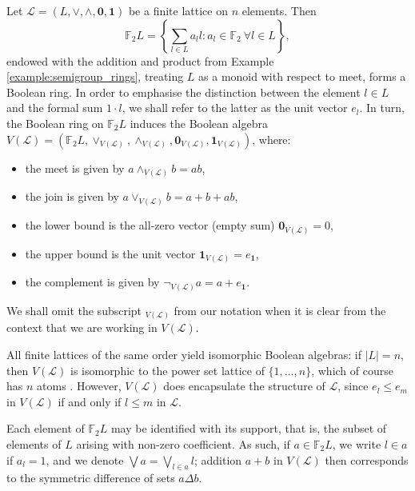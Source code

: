 \documentclass[a4paper, 11pt]{article}
\theoremstyle{plain}
\theoremstyle{definition}
\newcommand{\F} {\mathbb{F}}
\newcommand{\join}      {\lor}
\newcommand{\meet}      {\land}
\newcommand{\bigjoin}   {\bigvee}
\newcommand{\zero}      {\mathbf{0}}
\newcommand{\one}       {\mathbf{1}}
\begin{document}
Let $\mathcal{L} = (L, \join, \meet, \zero, \one)$ be a finite lattice on $n$ elements. Then 
\[
    \F_2 L = \left\{ \sum_{ l \in L } a_l l : a_l \in \F_2 \ \forall l \in L \right\},
\]
endowed with the addition and product from Example \ref{example:semigroup_rings}, treating $L$ as a monoid with respect to meet, forms a Boolean ring. In order to emphasise the distinction between the element $l \in L$ and the formal sum $1 \cdot l$, we shall refer to the latter as the unit vector $e_l$. In turn, the Boolean ring on $\F_2 L$ induces the Boolean algebra $V( \mathcal{L} ) = ( \F_2 L , \join_{ V( \mathcal{L} ) }, \meet_{ V( \mathcal{L} ) }, \zero_{ V( \mathcal{L} ) }, \one_{ V( \mathcal{L} ) } )$, where:
\begin{itemize}
    \item the meet is given by $a \meet_{ V( \mathcal{L} ) } b = ab$,

    \item the join is given by $a \join_{ V( \mathcal{L} ) } b = a + b + ab$,

    \item the lower bound is the all-zero vector (empty sum) $\zero_{ V( \mathcal{L} ) } = 0$,

    \item the upper bound is the unit vector $\one_{ V( \mathcal{L} ) } = e_\one$,

    \item the complement is given by $\neg_{ V( \mathcal{L} ) } a = a + e_\one$.
\end{itemize}
We shall omit the subscript $_{ V( \mathcal{L} ) }$ from our notation when it is clear from the context that we are working in $V( \mathcal{L} )$.

All finite lattices of the same order yield isomorphic Boolean algebras: if $|L| = n$, then $V( \mathcal{L} )$ is isomorphic to the power set lattice of $\{1, \dots, n\}$, which of course has $n$ atoms \cite{GH09}. However, $V( \mathcal{L} )$ does encapsulate the structure of $\mathcal{L}$, since $e_l \le e_m$ in $V( \mathcal{L} )$ if and only if $l \le m$ in $\mathcal{L}$.




Each element of $\F_2 L$ may be identified with its support, that is, the subset of elements of $L$ arising with non-zero coefficient. As such, if $a \in \F_2 L$, we write $l \in a$ if $a_l = 1$, and we denote $\bigjoin a = \bigjoin_{l \in a} l$; addition $a+b$ in $V( \mathcal{L} )$ then corresponds to the symmetric difference of sets $a \Delta b$. 
\end{document}
